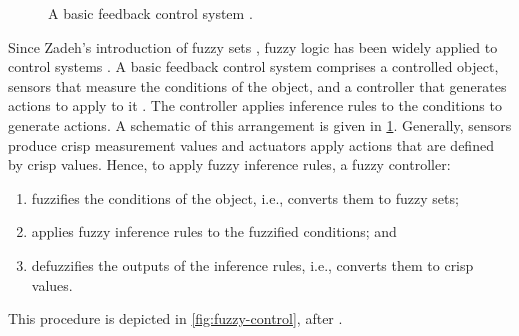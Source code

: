 \begin{figure}
  \centering
  \caption{A basic feedback control system \parencite[27]{Doyle1990}.}
  \label{fig:feedback-control}
\end{figure}

Since Zadeh's introduction of fuzzy sets \parencite*{Zadeh1965}, fuzzy logic has been
widely applied to control systems \parencite[330]{Klir1995}.
A basic feedback control system comprises a controlled object, sensors that measure the
conditions of the object, and a controller that generates actions to apply to it
\parencite[27]{Doyle1990}.
The controller applies inference rules to the conditions to generate actions.
A schematic of this arrangement is given in \cref{fig:feedback-control}.
Generally, sensors produce crisp measurement values and actuators apply actions that
are defined by crisp values.
Hence, to apply fuzzy inference rules, a fuzzy controller:
\begin{enumerate}
  \item fuzzifies the conditions of the object, i.e., converts them to fuzzy sets;
  \item applies fuzzy inference rules to the fuzzified conditions; and
  \item defuzzifies the outputs of the inference rules, i.e., converts them to crisp
        values.
\end{enumerate}
This procedure is depicted in \cref{fig:fuzzy-control}, after
\textcite[331-332]{Klir1995}.

